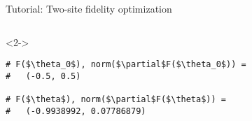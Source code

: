 \begin{frame}[fragile]{Tutorial: Two-site fidelity optimization}
\begin{columns}
\begin{column}{5cm}
\begin{onlyenv}
\end{onlyenv}

\begin{onlyenv}<2->

\begin{lstlisting}[style=julia, numbers=none, mathescape, basicstyle=\small]
# F($\theta_0$), norm($\partial$F($\theta_0$)) =
#   (-0.5, 0.5)

# F($\theta$), norm($\partial$F($\theta$)) =
#   (-0.9938992, 0.07786879)
 \end{lstlisting}

\end{onlyenv}

\end{column}

\end{columns}

\end{frame}
